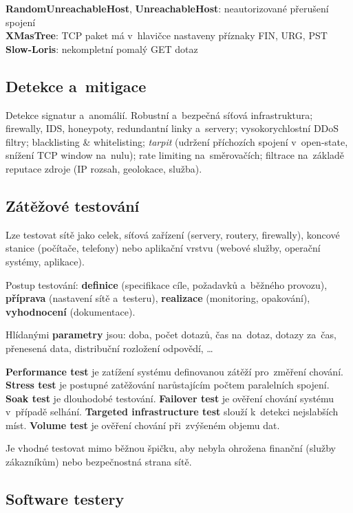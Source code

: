 \textbf{RandomUnreachableHost}, \textbf{UnreachableHost}: neautorizované přerušení spojení \\
\textbf{XMasTree}: TCP paket má v~hlavičce nastaveny příznaky FIN, URG, PST \\
\textbf{Slow-Loris}: nekompletní pomalý GET dotaz

\clearpage

\subsection{Detekce a~mitigace}

Detekce signatur a~anomálií. Robustní a~bezpečná síťová infrastruktura; firewally, IDS, honeypoty, redundantní linky a~servery; vysokorychlostní DDoS filtry; blacklisting \& whitelisting; \emph{tarpit} (udržení příchozích spojení v~open-state, snížení TCP window na~nulu); rate limiting na~směrovačích; filtrace na~základě reputace zdroje (IP rozsah, geolokace, služba).

\subsection{Zátěžové testování}

Lze testovat sítě jako celek, síťová zařízení (servery, routery, firewally), koncové stanice (počítače, telefony) nebo aplikační vrstvu (webové služby, operační systémy, aplikace).

Postup testování: \textbf{definice} (specifikace cíle, požadavků a~běžného provozu), \textbf{příprava} (nastavení sítě a~testeru), \textbf{realizace} (monitoring, opakování), \textbf{vyhodnocení} (dokumentace).

Hlídanými \textbf{parametry} jsou: doba, počet dotazů, čas na~dotaz, dotazy za~čas, přenesená data, distribuční rozložení odpovědí, \dots

\textbf{Performance test} je zatížení systému definovanou zátěží pro~změření chování. \textbf{Stress test} je postupné zatěžování narůstajícím počtem paralelních spojení. \textbf{Soak test} je dlouhodobé testování. \textbf{Failover test} je ověření chování systému v~případě selhání. \textbf{Targeted infrastructure test} slouží k~detekci nejslabších míst. \textbf{Volume test} je ověření chování při~zvýšeném objemu dat.

Je vhodné testovat mimo běžnou špičku, aby nebyla ohrožena finanční (služby zákazníkům) nebo bezpečnostná strana sítě.

\subsection{Software testery}


